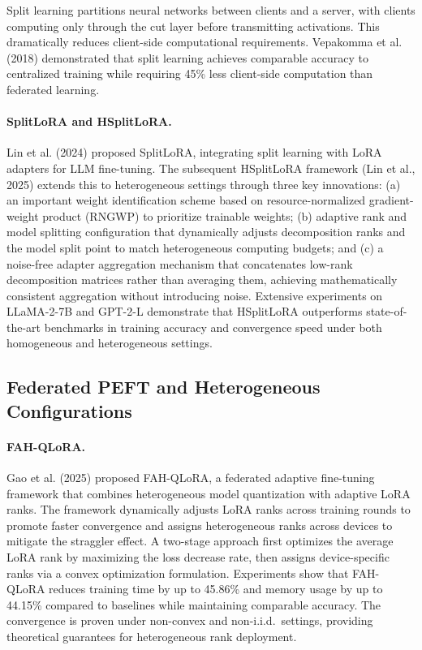 \documentclass[11pt,a4paper]{article}
\begin{document}
Split learning partitions neural networks between clients and a server, with clients computing only through the cut layer before transmitting activations. This dramatically reduces client-side computational requirements. Vepakomma et al. (2018) demonstrated that split learning achieves comparable accuracy to centralized training while requiring 45\% less client-side computation than federated learning.

\paragraph{SplitLoRA and HSplitLoRA.}
Lin et al. (2024) proposed SplitLoRA, integrating split learning with LoRA adapters for LLM fine-tuning. The subsequent HSplitLoRA framework (Lin et al., 2025) extends this to heterogeneous settings through three key innovations: (a) an important weight identification scheme based on resource-normalized gradient-weight product (RNGWP) to prioritize trainable weights; (b) adaptive rank and model splitting configuration that dynamically adjusts decomposition ranks and the model split point to match heterogeneous computing budgets; and (c) a noise-free adapter aggregation mechanism that concatenates low-rank decomposition matrices rather than averaging them, achieving mathematically consistent aggregation without introducing noise. Extensive experiments on LLaMA-2-7B and GPT-2-L demonstrate that HSplitLoRA outperforms state-of-the-art benchmarks in training accuracy and convergence speed under both homogeneous and heterogeneous settings.

\subsection{Federated PEFT and Heterogeneous Configurations}

\paragraph{FAH-QLoRA.}
Gao et al. (2025) proposed FAH-QLoRA, a federated adaptive fine-tuning framework that combines heterogeneous model quantization with adaptive LoRA ranks. The framework dynamically adjusts LoRA ranks across training rounds to promote faster convergence and assigns heterogeneous ranks across devices to mitigate the straggler effect. A two-stage approach first optimizes the average LoRA rank by maximizing the loss decrease rate, then assigns device-specific ranks via a convex optimization formulation. Experiments show that FAH-QLoRA reduces training time by up to 45.86\% and memory usage by up to 44.15\% compared to baselines while maintaining comparable accuracy. The convergence is proven under non-convex and non-i.i.d.\ settings, providing theoretical guarantees for heterogeneous rank deployment.
\end{document}
